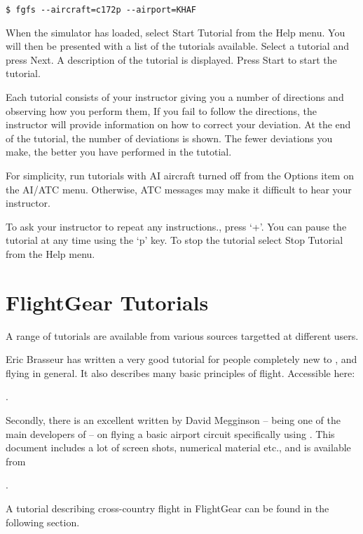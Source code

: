 \begin{verbatim}
$ fgfs --aircraft=c172p --airport=KHAF
\end{verbatim}

When the simulator has loaded, select Start Tutorial from the Help menu. You
will then be presented with a list of the tutorials available. Select a tutorial
and press Next. A description of the tutorial is displayed. Press Start
 to start the tutorial.

Each tutorial consists of your instructor giving you a number of directions and
observing how you perform them, If you fail to follow the directions, the
instructor will provide information on how to correct your deviation. At the end
of the tutorial, the number of deviations is shown. The fewer deviations you
make, the better you have performed in the tutotial.

For simplicity, run tutorials with AI aircraft turned off from
the Options item on the AI/ATC menu. Otherwise, ATC messages 
may make it difficult to hear your instructor.

To ask your instructor to repeat any instructions., press `+'. You can pause the
tutorial at any time using the `p' key. To stop the tutorial select Stop Tutorial from the Help menu. 

\section{FlightGear Tutorials}

A range of \FlightGear{} tutorials are available from various sources targetted at different users. 

Eric Brasseur has written a very good tutorial for people completely new to \FlightGear{}, and flying in general. It also describes many basic principles of flight. Accessible here: 

\medskip
{}.
\medskip

Secondly, there is an excellent  written by David
Megginson  -- being one of the main developers
of \FlightGear{} -- on flying a basic airport circuit specifically
using \FlightGear{}. This document includes a lot of screen shots,
numerical material etc., and is available from

\medskip
{}.
\medskip

A tutorial describing cross-country flight in FlightGear can be found in the following section.

